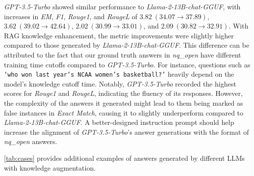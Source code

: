 \emph{GPT-3.5-Turbo} showed similar performance to \emph{Llama-2-13B-chat-GGUF}, with increases in \emph{EM}, \emph{F1}, \emph{Rouge1}, and \emph{RougeL} of $3.82~(34.07 \rightarrow 37.89)$, $3.62~(39.02 \rightarrow 42.64)$, $2.02~(30.99 \rightarrow 33.01)$, and $2.09~(30.82 \rightarrow 32.91)$. With RAG knowledge enhancement, the metric improvements were slightly higher compared to those generated by \emph{Llama-2-13B-chat-GGUF}. This difference can be attributed to the fact that our ground truth answers in \emph{nq\_open} have different training time cutoffs compared to \emph{GPT-3.5-Turbo}. For instance, questions such as \texttt{‘who won last year’s NCAA women’s basketball?’} heavily depend on the model's knowledge cutoff time. Notably, \emph{GPT-3.5-Turbo} recorded the highest scores for \emph{Rouge1} and \emph{RougeL}, indicating the fluency of its responses. However, the complexity of the answers it generated might lead to them being marked as false instances in \emph{Exact Match}, causing it to slightly underperform compared to \emph{Llama-2-13B-chat-GGUF}. A better-designed instruction prompt should help increase the alignment of \emph{GPT-3.5-Turbo}’s answer generations with the format of \emph{nq\_open} answers.

\cref{tab:cases} provides additional examples of answers generated by different LLMs with knowledge augmentation.